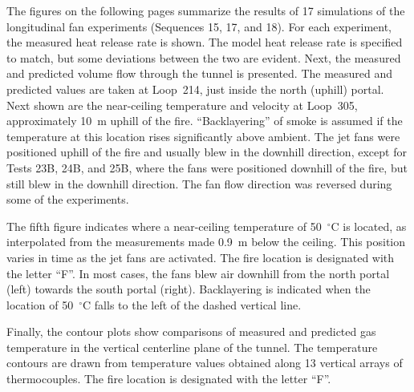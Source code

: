 The figures on the following pages summarize the results of 17 simulations of the longitudinal fan experiments (Sequences 15, 17, and 18). For each experiment, the measured heat release rate is shown. The model heat release rate is specified to match, but some deviations between the two are evident. Next, the measured and predicted volume flow through the tunnel is presented. The measured and predicted values are taken at Loop~214, just inside the north (uphill) portal. Next shown are the near-ceiling temperature and velocity at Loop~305, approximately 10~m uphill of the fire. ``Backlayering'' of smoke is assumed if the temperature at this location rises significantly above ambient. The jet fans were positioned uphill of the fire and usually blew in the downhill direction, except for Tests 23B, 24B, and 25B, where the fans were positioned downhill of the fire, but still blew in the downhill direction. The fan flow direction was reversed during some of the experiments.

The fifth figure indicates where a near-ceiling temperature of 50~$^\circ$C is located, as interpolated from the measurements made 0.9~m below the ceiling. This position varies in time as the jet fans are activated. The fire location is designated with the letter ``F''. In most cases, the fans blew air downhill from the north portal (left) towards the south portal (right). Backlayering is indicated when the location of 50~$^\circ$C falls to the left of the dashed vertical line.

Finally, the contour plots show comparisons of measured and predicted gas temperature in the vertical centerline plane of the tunnel. The temperature contours are drawn from temperature values obtained along 13 vertical arrays of thermocouples. The fire location is designated with the letter ``F''.

\newpage

